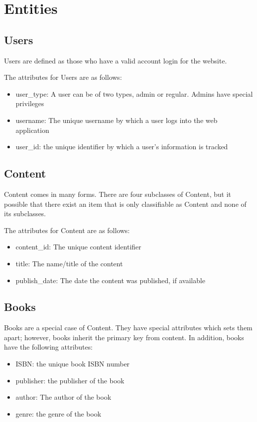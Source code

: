 \documentclass[letter, 12pt, titlepage]{article}
\begin{document}
	\section{Entities}
		\subsection{Users}
			Users are defined as those who have a valid account login for the website.

			The attributes for Users are as follows:
			\begin{itemize}
				\item user\_type: A user can be of two types, admin or regular. Admins have special privileges
				\item username: The unique username by which a user logs into the web application
				\item user\_id: the unique identifier by which a user's information is tracked
			\end{itemize}
		\subsection{Content}
			Content comes in many forms. There are four subclasses of Content, but it possible that there exist an item that is only classifiable as Content and none of its subclasses. 
			
			The attributes for Content are as follows:
			\begin{itemize}
				\item content\_id: The unique content identifier
				\item title: The name/title of the content
				\item publish\_date: The date the content was published, if available
			\end{itemize}
		\subsection{Books}
			Books are a special case of Content. They have special attributes which sets them apart; however, books inherit the primary key from content. In addition, books have the following attributes:
			\begin{itemize}
				\item ISBN: the unique book ISBN number
				\item publisher: the publisher of the book
				\item author: The author of the book
				\item genre: the genre of the book
			\end{itemize}
\end{document}
